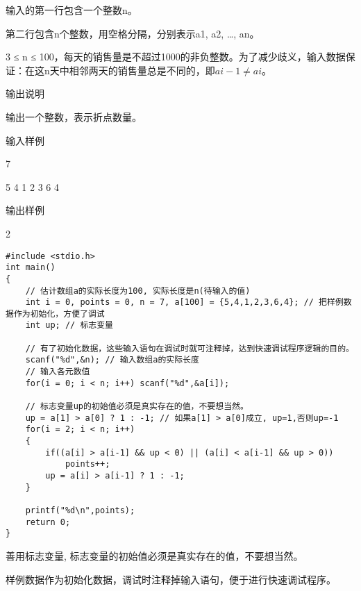 输入的第一行包含一个整数n。

第二行包含n个整数，用空格分隔，分别表示a1, a2, \dots, an。

3 ≤ n ≤ 100，每天的销售量是不超过1000的非负整数。为了减少歧义，输入数据保证：在这n天中相邻两天的销售量总是不同的，即$ai-1\ne ai$。

输出说明	

输出一个整数，表示折点数量。

输入样例	

7

5 4 1 2 3 6 4

输出样例
	
2

\begin{lstlisting}
#include <stdio.h>
int main()
{
    // 估计数组a的实际长度为100, 实际长度是n(待输入的值)
	int i = 0, points = 0, n = 7, a[100] = {5,4,1,2,3,6,4}; // 把样例数据作为初始化，方便了调试
	int up; // 标志变量 
	
	// 有了初始化数据，这些输入语句在调试时就可注释掉，达到快速调试程序逻辑的目的。
	scanf("%d",&n); // 输入数组a的实际长度
	// 输入各元数值
	for(i = 0; i < n; i++) scanf("%d",&a[i]);
	
	// 标志变量up的初始值必须是真实存在的值，不要想当然。
	up = a[1] > a[0] ? 1 : -1; // 如果a[1] > a[0]成立, up=1,否则up=-1
	for(i = 2; i < n; i++)
	{
		if((a[i] > a[i-1] && up < 0) || (a[i] < a[i-1] && up > 0))
			points++;
		up = a[i] > a[i-1] ? 1 : -1;
	}
	
	printf("%d\n",points);
	return 0;
} 
\end{lstlisting}

\begin{note}[要点]
	善用标志变量, 标志变量的初始值必须是真实存在的值，不要想当然。
	
	样例数据作为初始化数据，调试时注释掉输入语句，便于进行快速调试程序。
\end{note}

